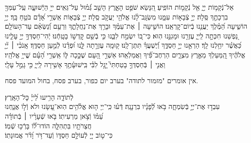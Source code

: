 \documentclass[twoside, openany, parskip=half, 11pt]{book}
\begin{document}
אֵל־נְֿקָמ֥וֹת יְיָ֑ אֵ֖ל נְֿקָמ֣וֹת הוֹפִֽיעַ׃ \hfill \break
הִ֭נָּשֵׂא שֹׁפֵ֣ט הָאָ֑רֶץ הָשֵׁ֥ב גְּֿ֝מ֗וּל עַל־גֵּאִֽים׃ \hfill \break
{}ייָ֥ הַיְֿשׁוּעָ֑ה עַֽל־עַמְּךָ֖ בִרְכָתֶ֣ךָ סֶּֽלָה׃ \hfill \break
{} יְיָ֣ צְֿבָא֣וֹת עִמָּ֑נוּ מִשְׂגָּֽב־לָ֨נוּ אֱלֹהֵ֖י יַעֲקֹ֣ב סֶֽלָה׃ \hfill \break
{} יְיָ֥ צְֿבָא֑וֹת אַֽשְׁרֵ֥י אָ֝דָ֗ם בֹּטֵ֥חַ בָּֽךְ׃ \hfill \break
{} יְיָ֥ הוֹשִׁ֑יעָה הַ֝מֶּ֗לֶךְ יַעֲנֵ֥נוּ בְֿיוֹם־קׇרְאֵֽנוּ׃ \hfill \break
{}הוֹשִׁ֤יעָה ׀ אֶת־עַמֶּ֗ךָ וּבָרֵ֥ךְ אֶת־נַחֲלָתֶ֑ךָ וּֽרְעֵ֥ם וְֿ֝נַשְּׂאֵ֗ם עַד־הָעוֹלָֽם׃ \hfill \break
{}נַ֭פְשֵׁנוּ חִכְּתָ֣ה לַֽייָ֑ עֶזְרֵ֖נוּ וּמָגִנֵּ֣נוּ הֽוּא׃ \hfill \break
כִּי־ב֭וֹ יִשְׂמַ֣ח לִבֵּ֑נוּ כִּ֤י בְֿשֵׁ֖ם קׇדְשׁ֣וֹ בָטָֽחְֿנוּ׃ \hfill \break
יְֿהִי־חַסְדְּךָ֣ יְיָ֣ עָלֵ֑ינוּ כַּ֝אֲשֶׁ֗ר יִחַ֥לְנוּ לָֽךְ׃ \hfill \break
{}הַרְאֵ֣נוּ יְיָ֣ חַסְדֶּ֑ךָ וְֿ֝יֶשְׁעֲךָ֗ תִּתֶּן־לָֽנוּ׃ \hfill \break
{}ק֭וּמָֽה עֶזְרָ֣תָה לָּ֑נוּ וּ֝פְדֵ֗נוּ לְֿמַ֣עַן חַסְדֶּֽךָ׃ \hfill \break
{}אָֽנֹכִ֨י ׀ יְ֘יָ֤ אֱלֹהֶ֗יךָ הַֽ֭מַּעַלְךָ מֵאֶ֣רֶץ מִצְרָ֑יִם הַרְחֶב־פִּ֗֝יךָ וַאֲמַלְאֵֽהוּ׃ \hfill \break
{}אַשְׁרֵ֣י הָ֭עָם שֶׁכָּ֣כָה לּ֑וֹ אַֽשְׁרֵ֥י הָ֝עָ֗ם שֱׁייָ֥ אֱלֹהָֽיו׃ \hfill \break
{}וַאֲנִ֤י ׀ בְּֿחַסְדְּךָ֣ בָטַחְתִּי֮ יָ֤גֵ֥ל לִבִּ֗י בִּֽישׁוּעָ֫תֶ֥ךָ אָשִׁ֥ירָה לַֽייָ֑ כִּ֖י גָמַ֣ל עָלָֽי׃ \hfill \break

\negline

\begin{narrow}
\begin{scriptsize} %
\textsf{
אין אומרים "מזמור לתודה" בערב יום כפור, בערב פסח, בחול המועד פסח.\\
}\end{scriptsize}
 לְֿתוֹדָ֑ה \hfill
הָרִ֥יעוּ לַ֝ייָ֗ כׇּל־הָאָֽרֶץ׃\\
עִבְד֣וּ אֶת־יְיָ֣ בְּֿשִׂמְחָ֑ה \hfill בֹּ֥אוּ לְֿ֝פָנָ֗יו בִּרְנָנָֽה׃
דְּֿע֗וּ כִּֽי־יְיָ ה֤וּא אֱלֹ֫הִ֥ים \hfill הֽוּא־עָ֭שָׂנוּ ולא וְֿל֣וֹ אֲנַ֑חְנוּ\\ עַ֝מּ֗וֹ וְֿצֹ֣אן מַרְעִיתֽוֹ׃ \hfill
בֹּ֤אוּ שְֿׁעָרָ֨יו ׀ בְּֿתוֹדָ֗ה \\ חֲצֵרֹתָ֥יו בִּתְהִלָּ֑ה \hfill הוֹדוּ־ל֗֝וֹ בָּרְֿכ֥וּ שְֿׁמֽוֹ׃\\
כִּי־ט֣וֹב יְיָ֭ לְֿעוֹלָ֣ם חַסְדּ֑וֹ \hfill וְֿעַד־דֹּ֥ר וָ֝דֹ֗ר אֱמוּנָתֽוֹ׃
\end{narrow}
\end{document}
